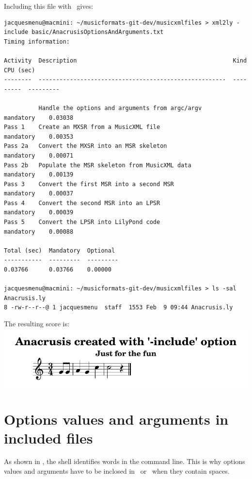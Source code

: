Including this file with \xmlToLy\ gives:
\begin{lstlisting}[language=Terminal]
jacquesmenu@macmini: ~/musicformats-git-dev/musicxmlfiles > xml2ly -include basic/AnacrusisOptionsAndArguments.txt
Timing information:

Activity  Description                                             Kind       CPU (sec)
--------  ------------------------------------------------------  ---------  ---------

          Handle the options and arguments from argc/argv         mandatory    0.03038
Pass 1    Create an MXSR from a MusicXML file                  mandatory    0.00353
Pass 2a   Convert the MXSR into an MSR skeleton                    mandatory    0.00071
Pass 2b   Populate the MSR skeleton from MusicXML data            mandatory    0.00139
Pass 3    Convert the first MSR into a second MSR                 mandatory    0.00037
Pass 4    Convert the second MSR into an LPSR                     mandatory    0.00039
Pass 5    Convert the LPSR into LilyPond code                 mandatory    0.00088

Total (sec)  Mandatory  Optional
-----------  ---------  ---------
0.03766      0.03766    0.00000

jacquesmenu@macmini: ~/musicformats-git-dev/musicxmlfiles > ls -sal Anacrusis.ly
8 -rw-r--r--@ 1 jacquesmenu  staff  1553 Feb  9 09:44 Anacrusis.ly
\end{lstlisting}

The resulting score is:\\
\includegraphics[scale=0.7]{../mfgraphics/mfgraphicsAnacrusisWithInclude.png}


\section{Options values and arguments in included files}

As shown in , the shell identifies words in the command line. This is why options values and arguments have to be inclosed in \quotes\ or \doubleQuotes\ when they contain spaces.

